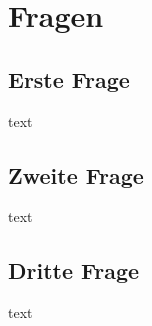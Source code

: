 \section{Fragen}
\subsection{Erste Frage}
text


\subsection{Zweite Frage}
text

\subsection{Dritte Frage}
text